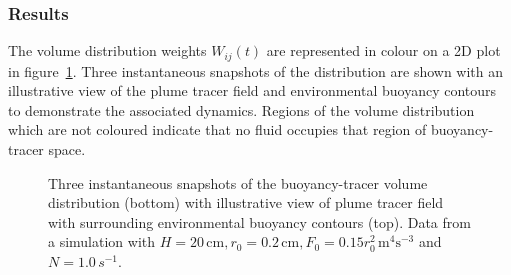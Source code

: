 \documentclass[a4paper]{article}
\begin{document}
\subsubsection{Results}
The volume distribution weights $W_{ij}(t)$ are represented in colour on a 2D plot in figure~\ref{fig:jointPDF}.
Three instantaneous snapshots of the distribution are shown with an illustrative view of the plume tracer
field and environmental buoyancy contours to demonstrate the associated dynamics. Regions of the volume
distribution which are not coloured indicate that no fluid occupies that region of buoyancy-tracer space.

\begin{figure}
	\centering
	\caption{Three instantaneous snapshots of the buoyancy-tracer volume distribution (bottom) with  illustrative view
	of plume tracer field with surrounding environmental buoyancy contours (top). Data from a simulation with
	$H = 20\,\mathrm{cm}, r_0 = 0.2 \, \mathrm{cm}, F_0 = 0.15r_0^2 \, \mathrm{m}^4 \mathrm{s}^{-3}$ and 
	$N = 1.0 \,s^{-1}$.}
	\label{fig:jointPDF}
\end{figure}
\end{document}
